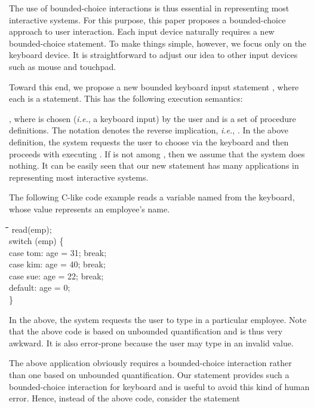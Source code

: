 \documentclass[letter]{ieice}
\newcommand{\ie}{{\em i.e.}}
\newenvironment{exmple}{
 \begingroup \begin{tabbing} \hspace{2em}\= \hspace{3em}\= \hspace{3em}\=
\hspace{3em}\= \hspace{3em}\= \hspace{3em}\= \kill}{
 \end{tabbing}\endgroup}
\begin{document}
The use of bounded-choice interactions is thus essential  in 
representing most interactive
systems. For this purpose, this paper proposes  a bounded-choice approach to user 
 interaction. Each input device naturally requires a new
bounded-choice statement.   To make things simple,  however, 
we focus only on the keyboard device. It is straightforward
to adjust our idea to other input devices such as  mouse and  touchpad.

Toward this end, we propose a new bounded keyboard input statement 
, 
where each   is a statement. This has the following execution semantics:


 

\noindent , where  is  chosen (\ie, a keyboard input) by the user and  is a 
set of procedure definitions.  The notation  denotes the reverse implication, \ie, 
.
In the above definition, the system  requests the user to choose  via the keyboard 
and then proceeds
with executing .  If  is not among , then we assume that the system does 
nothing.
It can be easily seen that our new statement has many applications
 in representing most interactive systems.

The following C-like code example reads a variable named  from the keyboard,
 whose value represents an employee's name. 

\begin{exmple}
        read(emp); \\
        switch (emp) \{ \\
 \>           case tom:  age = 31;   break; \\
  \>          case kim: age = 40;   break;\\
 \>           case sue: age = 22;    break;\\
 \>           default: age = 0;          \\
        \}\\
\end{exmple}

\noindent 
In the above, the system 
 requests the user to type in a particular employee. 
 Note that the above code is based on unbounded quantification
 and is thus very awkward. It is also  error-prone 
 because the user may type in  an invalid value.

The above application obviously
 requires a bounded-choice interaction rather than  one based on
unbounded quantification.
Our  statement provides such a  bounded-choice interaction for  keyboard   
 and is useful to avoid this kind of human error.
Hence, instead of the above code, consider the statement 
\end{document}
